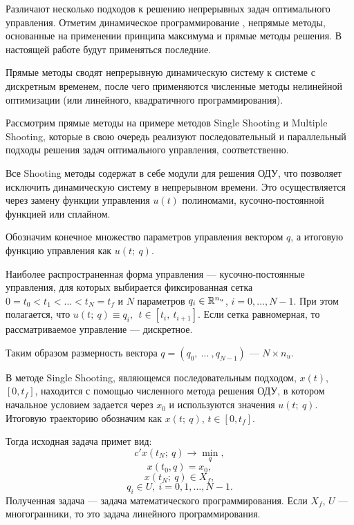Различают несколько подходов к решению  непрерывных задач оптимального управления. Отметим динамическое программирование \cite{Bellman}, непрямые методы, основанные на применении принципа максимума \cite{Pontryagin} и прямые методы решения. В настоящей работе будут применяться последние.




Прямые методы сводят непрерывную динамическую систему к системе с дискретным временем, после чего применяются численные методы нелинейной оптимизации (или линейного, квадратичного программирования).


Рассмотрим прямые методы на примере методов Single Shooting и Multiple Shooting, которые в свою очередь реализуют последовательный и параллельный подходы решения задач оптимального управления, соответственно.


Все Shooting методы содержат в себе модули для решения ОДУ, что позволяет исключить динамическую систему в непрерывном времени. Это осуществляется через замену функции управления $u(t)$ полиномами, кусочно-постоянной функцией или сплайном.


Обозначим конечное множество параметров управления вектором $q$, а итоговую функцию управления как $u(t;~q)$.


Наиболее распространенная форма управления --- кусочно-постоянные  управления, для которых выбирается фиксированная сетка $0 = t_0 < t_1 < ... < t_N = t_f$ и $N$ параметров $q_i \in \mathbb{R}^{n_u}$, $i = 0,..., N - 1$. При этом полагается, что $u(t;~q) \equiv q_i, ~~ t \in [t_i,~t_{i+1}]$. Если сетка равномерная, то рассматриваемое управление --- дискретное.


Таким образом размерность вектора $q = (q_0,~...~,q_{N-1})$ --- $N\times n_u$.


В методе Single Shooting, являющемся последовательным подходом, $x(t)$, $[0, t_f]$, находится с помощью численного метода решения ОДУ, в котором начальное условием задается через $x_0$ и используются значения $u(t;~q)$. Итоговую траекторию обозначим как $x(t;~q)$, $t\in [0, t_f]$.


Тогда исходная задача примет вид:
\[c'x(t_N;~q) \to \min_q,\] 
\[x(t_0, q) = x_0,\]
\[ x(t_N;~q) \in X_f,\] 
\[ q_i \in U, \ i = 0,1, \ldots, N-1.\]
Полученная задача --- задача математического программирования. Если $X_f$, $U$ --- многогранники, то это задача линейного программирования.

